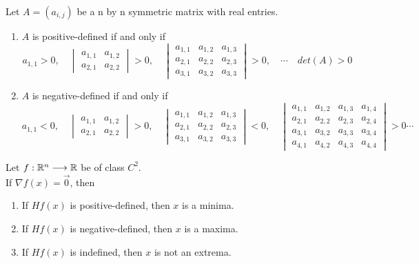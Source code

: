 \begin{theorem*}
    Let $A=(a_{i,j})$ be a n by n symmetric matrix with real entries.
    \begin{enumerate}
        \item $A$ is positive-defined if and only if
        $$a_{1,1}>0, \quad \begin{vmatrix}
            a_{1,1} & a_{1,2}\\
            a_{2,1} & a_{2,2}
        \end{vmatrix}>0, \quad \begin{vmatrix}
            a_{1,1} & a_{1,2} & a_{1,3}\\
            a_{2,1} & a_{2,2} & a_{2,3}\\
            a_{3,1} & a_{3,2} & a_{3,3}
        \end{vmatrix}>0, \quad \cdots \quad det(A)>0$$
        \item $A$ is negative-defined if and only if
        $$a_{1,1}<0, \quad \begin{vmatrix}
            a_{1,1} & a_{1,2}\\
            a_{2,1} & a_{2,2}
        \end{vmatrix}>0, \quad \begin{vmatrix}
            a_{1,1} & a_{1,2} & a_{1,3}\\
            a_{2,1} & a_{2,2} & a_{2,3}\\
            a_{3,1} & a_{3,2} & a_{3,3}
        \end{vmatrix}<0, \quad \begin{vmatrix}
            a_{1,1} & a_{1,2} & a_{1,3} & a_{1,4}\\
            a_{2,1} & a_{2,2} & a_{2,3} & a_{2,4}\\
            a_{3,1} & a_{3,2} & a_{3,3} & a_{3,4}\\
            a_{4,1} & a_{4,2} & a_{4,3} & a_{4,4}
        \end{vmatrix}>0\cdots$$
    \end{enumerate}
\end{theorem*}

\begin{theorem*}
    Let $f:\mathbb{R}^n\longrightarrow \mathbb{R}$ be of class $C^2$.\\
    If $\nabla f(x)=\vec{0}$, then
    \begin{enumerate}
        \item If $Hf(x)$ is positive-defined, then  $x$ is a minima.
        \item If $Hf(x)$ is negative-defined, then  $x$ is a maxima.
        \item If $Hf(x)$ is indefined, then $x$ is not an extrema.
    \end{enumerate}
\end{theorem*}

